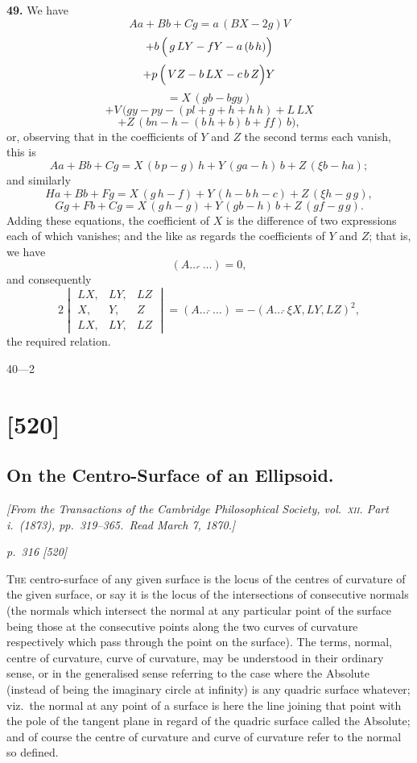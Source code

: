 \documentclass[11pt,a4paper]{book}
\begin{document}
\textbf{49.} We have
\[
Aa + Bb + Cg = a\,(BX - 2g)V
\]
\[
+ b\,\Bigl(\,g\,LY - f Y - a\,(b\,h)\Bigr)
\]
\[
+ p\,\Bigl(\,VZ - b\,LX - c\,b\,Z\Bigr) Y
\]
\[
= X\,(gb - bgy)
\]
\[
+ V\,(gy - py - (pl + g + h + h\,h) + L\,LX
\]
\[
+ Z\,(bn - h - (b\,h + b)\,b + ff)\,b),
\]
or, observing that in the coefficients of $Y$ and $Z$ the second terms each vanish, this is
\[
Aa + Bb + Cg = X\,(b\,p - g)\,h + Y\,(g a - h)\,b + Z\,(\xi b - h a);
\]
and similarly
\[
H a + B b + F g = X\,(g\,h - f) + Y\,(h - b\,h - c) + Z\,(\xi h - g\,g),
\]
\[
G g + F b + C g = X\,(g\,h - g) + Y\,(g b - h)\,b + Z\,(g f - g\,g).
\]
Adding these equations, the coefficient of $X$ is the difference of two expressions each of which vanishes; and the like as regards the coefficients of $Y$ and $Z$; that is, we have
\[
(A\ldots\,\check{}\,\ldots) = 0,
\]
and consequently
\[
2\begin{vmatrix} LX, & LY, & LZ \\ X, & Y, & Z \\ LX, & LY, & LZ \end{vmatrix} = (A\ldots\,\check{}\,\ldots) = -(A\ldots\,\check{}\,\xi X, LY, LZ)^2,
\]
the required relation.

\hfill 40---2

\clearpage

\section{[520]}
\subsection{On the Centro-Surface of an Ellipsoid.}

\begin{center}
\textit{[From the Transactions of the Cambridge Philosophical Society, vol.~\textsc{xii.} Part i.\ (1873), pp.~319--365.\ Read March 7, 1870.]}
\end{center}

\bigskip
\textit{p.~316 [520]}
\smallskip

\noindent
\textsc{The} centro-surface of any given surface is the locus of the centres of curvature of the given surface, or say it is the locus of the intersections of consecutive normals (the normals which intersect the normal at any particular point of the surface being those at the consecutive points along the two curves of curvature respectively which pass through the point on the surface). The terms, normal, centre of curvature, curve of curvature, may be understood in their ordinary sense, or in the generalised sense referring to the case where the Absolute (instead of being the imaginary circle at infinity) is any quadric surface whatever; viz.\ the normal at any point of a surface is here the line joining that point with the pole of the tangent plane in regard of the quadric surface called the Absolute; and of course the centre of curvature and curve of curvature refer to the normal so defined.
\end{document}
